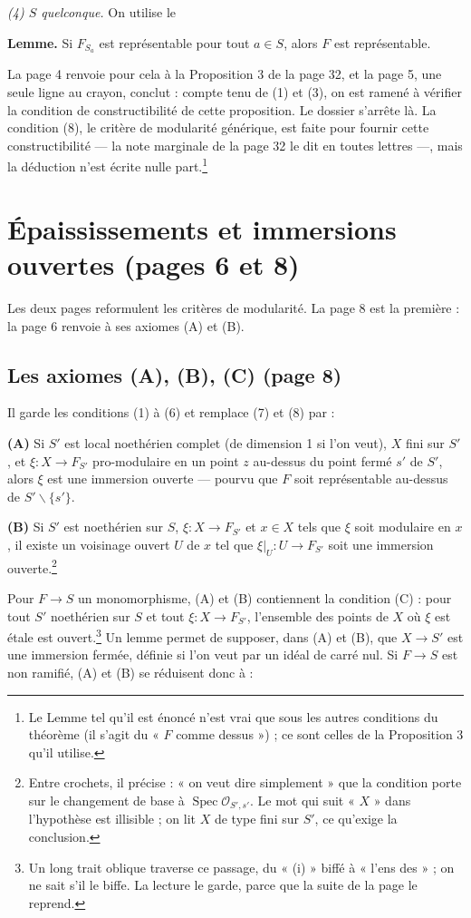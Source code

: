 \documentclass[11pt,a4paper]{article}
\begin{document}
\emph{(4) $S$ quelconque.} On utilise le

\textbf{Lemme.} Si $F_{S_a}$ est représentable pour tout $a \in S$, alors
$F$ est représentable.

La page 4 renvoie pour cela à la Proposition 3 de la page 32, et la page 5,
une seule ligne au crayon, conclut : compte tenu de (1) et (3), on est ramené
à vérifier la condition de constructibilité de cette proposition. Le dossier
s'arrête là. La condition (8), le critère de modularité générique, est faite
pour fournir cette constructibilité — la note marginale de la page 32 le dit
en toutes lettres —, mais la déduction n'est écrite nulle part.\footnote{Le
Lemme tel qu'il est énoncé n'est vrai que sous les autres conditions du
théorème (il s'agit du « $F$ comme dessus ») ; ce sont celles de la
Proposition 3 qu'il utilise.}

\section*{Épaississements et immersions ouvertes (pages 6 et 8)}

Les deux pages reformulent les critères de modularité. La page 8 est la
première : la page 6 renvoie à ses axiomes (A) et (B).

\subsection*{Les axiomes (A), (B), (C) (page 8)}

Il garde les conditions (1) à (6) et remplace (7) et (8) par :

\textbf{(A)} Si $S'$ est local noethérien complet (de dimension 1 si l'on
veut), $X$ fini sur $S'$, et $\xi : X \to F_{S'}$ pro-modulaire en un point
$z$ au-dessus du point fermé $s'$ de $S'$, alors $\xi$ est une immersion
ouverte — pourvu que $F$ soit représentable au-dessus de $S' \smallsetminus
\{s'\}$.

\textbf{(B)} Si $S'$ est noethérien sur $S$, $\xi : X \to F_{S'}$ et $x \in
X$ tels que $\xi$ soit modulaire en $x$, il existe un voisinage ouvert $U$ de
$x$ tel que $\xi|_U : U \to F_{S'}$ soit une immersion ouverte.\footnote{Entre
crochets, il précise : « on veut dire simplement » que la condition porte sur
le changement de base à $\operatorname{Spec} \mathcal{O}_{S',s'}$. Le mot qui
suit « $X$ » dans l'hypothèse est illisible ; on lit $X$ de type fini sur
$S'$, ce qu'exige la conclusion.}

Pour $F \to S$ un monomorphisme, (A) et (B) contiennent la condition (C) :
pour tout $S'$ noethérien sur $S$ et tout $\xi : X \to F_{S'}$, l'ensemble
des points de $X$ où $\xi$ est étale est ouvert.\footnote{Un long trait
oblique traverse ce passage, du « (i) » biffé à « l'ens des » ; on ne sait
s'il le biffe. La lecture le garde, parce que la suite de la page le
reprend.} Un lemme permet de supposer, dans (A) et (B), que $X \to S'$ est une
immersion fermée, définie si l'on veut par un idéal de carré nul. Si $F \to S$
est non ramifié, (A) et (B) se réduisent donc à :
\end{document}
